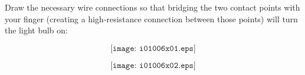 

Draw the necessary wire connections so that bridging the two contact points with your finger (creating a high-resistance connection between those points) will turn the light bulb on:

\vskip 40pt

$$\texttt{[image: i01006x01.eps]}$$

\vskip 30pt







$$\texttt{[image: i01006x02.eps]}$$











